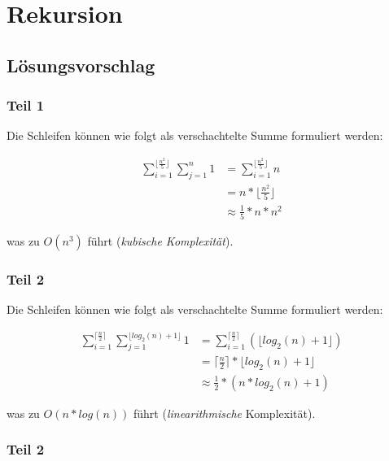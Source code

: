 \chapter{Rekursion}

\section{Lösungsvorschlag}

\subsection{Teil 1}

Die Schleifen können wie folgt als verschachtelte Summe formuliert werden:

\begin{equation}
    \begin{split}
        \sum_{i=1}^{\lfloor \frac{n^2}{5}\rfloor}  \sum_{j = 1}^{n} 1 &= \sum_{i=1}^{\lfloor \frac{n^2}{5} \rfloor}  n\\
        &= n * \lfloor \frac{n^2}{5} \rfloor \\
        & \approx \frac{1}{5} * n * n^2
    \end{split}
\end{equation}

was zu $O(n^3)$ führt (\textit{kubische Komplexität}).

\subsection{Teil 2}

Die Schleifen können wie folgt als verschachtelte Summe formuliert werden:

\begin{equation}
    \begin{split}
        \sum_{i=1}^{\lceil \frac{n}{2}\rceil}  \sum_{j = 1}^{\lfloor log_2(n) + 1 \rfloor} 1 &= \sum_{i=1}^{\lceil \frac{n}{2}\rceil} (\lfloor log_2(n) + 1 \rfloor) \\
        &= \lceil \frac{n}{2}\rceil * \lfloor log_2(n) + 1 \rfloor \\
        & \approx \frac{1}{2} * (n *  log_2(n) + 1)
    \end{split}
\end{equation}

was zu $O(n * log(n))$ führt (\textit{linearithmische} Komplexität).


\subsection{Teil 2}

